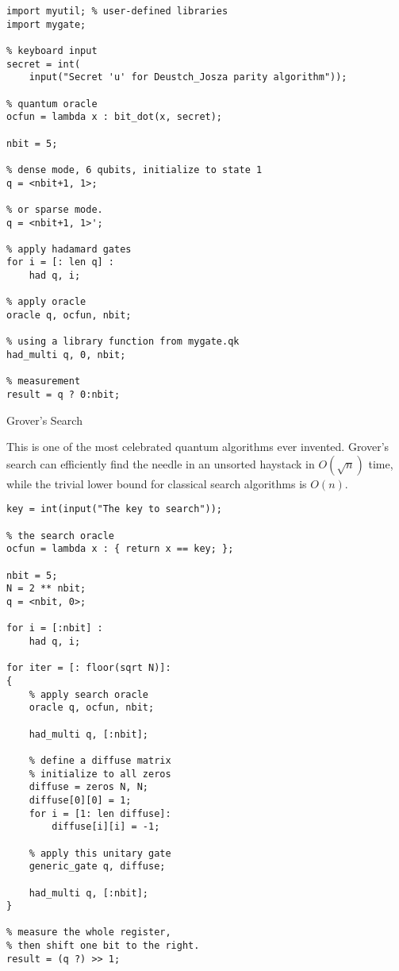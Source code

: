 \documentclass[]{article}
\begin{document}
\begin{verbatim}
import myutil; % user-defined libraries
import mygate;

% keyboard input
secret = int(
    input("Secret 'u' for Deustch_Josza parity algorithm"));

% quantum oracle
ocfun = lambda x : bit_dot(x, secret);

nbit = 5;

% dense mode, 6 qubits, initialize to state 1
q = <nbit+1, 1>;

% or sparse mode. 
q = <nbit+1, 1>';

% apply hadamard gates
for i = [: len q] :
    had q, i;

% apply oracle
oracle q, ocfun, nbit;

% using a library function from mygate.qk
had_multi q, 0, nbit;

% measurement
result = q ? 0:nbit; 
\end{verbatim}

Grover's Search

This is one of the most celebrated quantum algorithms ever invented.
Grover's search can efficiently find the needle in an unsorted haystack
in \(O(\sqrt{n})\) time, while the trivial lower bound for classical
search algorithms is \(O(n)\).

\begin{verbatim}
key = int(input("The key to search"));

% the search oracle
ocfun = lambda x : { return x == key; };

nbit = 5;
N = 2 ** nbit;
q = <nbit, 0>;

for i = [:nbit] :
    had q, i;

for iter = [: floor(sqrt N)]:
{
    % apply search oracle
    oracle q, ocfun, nbit;

    had_multi q, [:nbit];

    % define a diffuse matrix
    % initialize to all zeros
    diffuse = zeros N, N;
    diffuse[0][0] = 1;
    for i = [1: len diffuse]:
        diffuse[i][i] = -1;

    % apply this unitary gate
    generic_gate q, diffuse;

    had_multi q, [:nbit];
}

% measure the whole register, 
% then shift one bit to the right.
result = (q ?) >> 1;
\end{verbatim}
\end{document}
